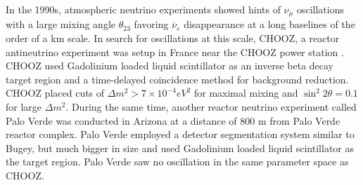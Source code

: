 \documentclass[11pt]{article}
\newcommand{\nuebar}{\ensuremath{\overline{\nu }_{e}} \hspace{1pt}}
\numberwithin{equation}{section}
\begin{document}
In the 1990s, atmospheric neutrino experiments showed hints of ${\nu}_{\mu}$  oscillations with a large mixing angle $\theta_{23}$ favoring \nuebar disappearance at a long baselines of the order of a km scale. In search for oscillations at this scale, CHOOZ, a reactor antineutrino experiment was setup in France near the CHOOZ power station \cite{apollonio1999limits}. CHOOZ used Gadolinium loaded liquid scintillator as an inverse beta decay target region and a time-delayed coincidence method for background reduction. CHOOZ placed cuts of $\Delta m^{2} > 7 \times 10^{-4} eV^{2}$ for maximal mixing and $\sin^{2} 2 \theta  = 0.1$ for large $\Delta m^{2}$. During the same time, another reactor neutrino experiment called Palo Verde was conducted in Arizona at a distance of 800 m from Palo Verde reactor complex. Palo Verde employed a detector segmentation system similar to Bugey, but much bigger in size and used Gadolinium loaded liquid scintillator as the target region. Palo Verde saw no oscillation \cite{boehm1999palo} in the same parameter space as CHOOZ. 
\end{document}
